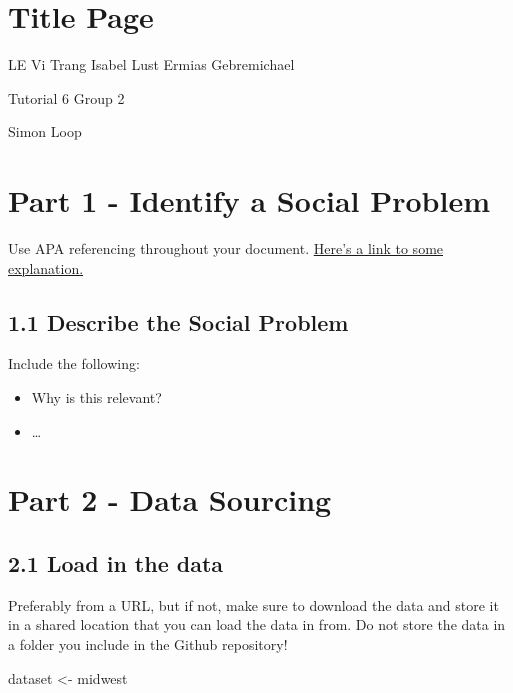\documentclass[
]{article}
\newenvironment{Shaded}{\begin{snugshade}}{\end{snugshade}}
\newcommand{\NormalTok}[1]{#1}
\newcommand{\OtherTok}[1]{\textcolor[rgb]{0.56,0.35,0.01}{#1}}
\begin{document}
\section{Title Page}\label{title-page}

LE Vi Trang Isabel Lust Ermias Gebremichael

Tutorial 6 Group 2

Simon Loop

\section{Part 1 - Identify a Social
Problem}\label{part-1---identify-a-social-problem}

Use APA referencing throughout your document.
\href{https://www.mendeley.com/guides/apa-citation-guide/}{Here's a link
to some explanation.}

\subsection{1.1 Describe the Social
Problem}\label{describe-the-social-problem}

Include the following:

\begin{itemize}
\item
  Why is this relevant?
\item
  \ldots{}
\end{itemize}

\section{Part 2 - Data Sourcing}\label{part-2---data-sourcing}

\subsection{2.1 Load in the data}\label{load-in-the-data}

Preferably from a URL, but if not, make sure to download the data and
store it in a shared location that you can load the data in from. Do not
store the data in a folder you include in the Github repository!

\begin{Shaded}
\begin{Highlighting}[]
\NormalTok{dataset }\OtherTok{\textless{}{-}}\NormalTok{ midwest}
\end{Highlighting}
\end{Shaded}
\end{document}
